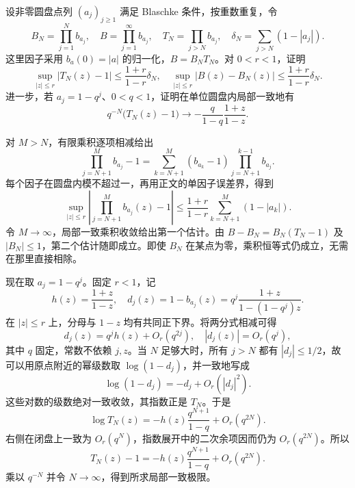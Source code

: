 \begin{exercise}\label{b3:ex:18-draft-04}
设非零圆盘点列 \((a_j)_{j\ge1}\) 满足 Blaschke 条件，按重数重复，令
\[
 B_N=\prod_{j=1}^Nb_{a_j},\quad B=\prod_{j=1}^\infty b_{a_j},\quad
 T_N=\prod_{j>N}b_{a_j},\quad
 \delta_N=\sum_{j>N}(1-|a_j|).
\]
这里因子采用 \(b_a(0)=|a|\) 的归一化，\(B=B_NT_N\)。对 \(0<r<1\)，证明
\[
 \sup_{|z|\le r}|T_N(z)-1|
 \le\frac{1+r}{1-r}\delta_N,\quad
 \sup_{|z|\le r}|B(z)-B_N(z)|
 \le\frac{1+r}{1-r}\delta_N.
\]
进一步，若 \(a_j=1-q^j\)、\(0<q<1\)，证明在单位圆盘内局部一致地有
\[
 q^{-N}\bigl(T_N(z)-1\bigr)
 \longrightarrow-\frac{q}{1-q}\frac{1+z}{1-z}.
\]
\end{exercise}
\begin{solution}
对 \(M>N\)，有限乘积逐项相减给出
\[
 \prod_{j=N+1}^Mb_{a_j}-1
 =\sum_{k=N+1}^M(b_{a_k}-1)\prod_{j=N+1}^{k-1}b_{a_j}.
\]
每个因子在圆盘内模不超过一，再用正文的单因子误差界，得到
\[
 \sup_{|z|\le r}\left|\prod_{j=N+1}^Mb_{a_j}(z)-1\right|
 \le\frac{1+r}{1-r}\sum_{k=N+1}^M(1-|a_k|).
\]
令 \(M\to\infty\)，局部一致乘积收敛给出第一个估计。由 \(B-B_N=B_N(T_N-1)\) 及 \(|B_N|\le1\)，第二个估计随即成立。即使 \(B_N\) 在某点为零，乘积恒等式仍成立，无需在那里直接相除。

现在取 \(a_j=1-q^j\)。固定 \(r<1\)，记
\[
 h(z)=\frac{1+z}{1-z},\quad
 d_j(z)=1-b_{a_j}(z)
 =q^j\frac{1+z}{1-(1-q^j)z}.
\]
在 \(|z|\le r\) 上，分母与 \(1-z\) 均有共同正下界。将两分式相减可得
\[
 d_j(z)=q^jh(z)+O_r(q^{2j}),\quad |d_j(z)|=O_r(q^j),
\]
其中 \(q\) 固定，常数不依赖 \(j,z\)。当 \(N\) 足够大时，所有 \(j>N\) 都有 \(|d_j|\le1/2\)，故可以用原点附近的幂级数取 \(\log(1-d_j)\)，并一致地写成
\[
 \log(1-d_j)=-d_j+O_r(|d_j|^2).
\]
这些对数的级数绝对一致收敛，其指数正是 \(T_N\)。于是
\[
 \log T_N(z)
 =-h(z)\frac{q^{N+1}}{1-q}+O_r(q^{2N}).
\]
右侧在闭盘上一致为 \(O_r(q^N)\)，指数展开中的二次余项因而仍为 \(O_r(q^{2N})\)。所以
\[
 T_N(z)-1=-h(z)\frac{q^{N+1}}{1-q}+O_r(q^{2N}).
\]
乘以 \(q^{-N}\) 并令 \(N\to\infty\)，得到所求局部一致极限。
\end{solution}

